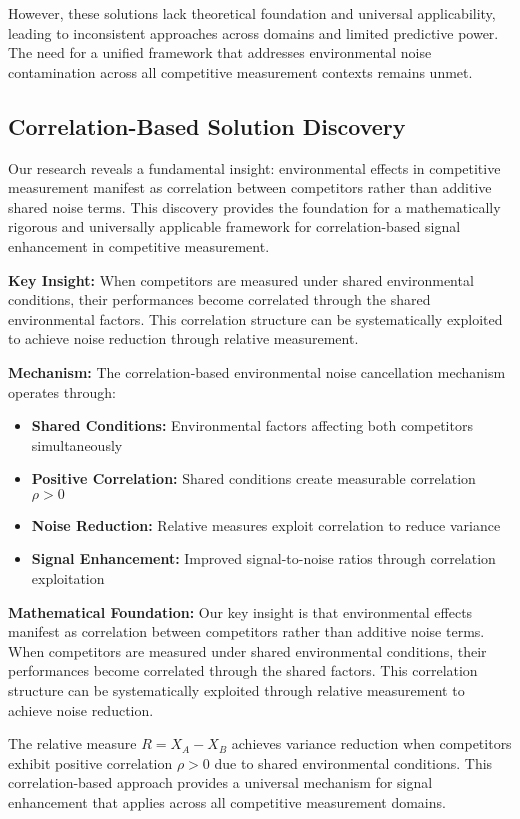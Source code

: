 However, these solutions lack theoretical foundation and universal applicability, leading to inconsistent approaches across domains and limited predictive power. The need for a unified framework that addresses environmental noise contamination across all competitive measurement contexts remains unmet.

\subsection{Correlation-Based Solution Discovery}

Our research reveals a fundamental insight: environmental effects in competitive measurement manifest as correlation between competitors rather than additive shared noise terms. This discovery provides the foundation for a mathematically rigorous and universally applicable framework for correlation-based signal enhancement in competitive measurement.

\textbf{Key Insight:}
When competitors are measured under shared environmental conditions, their performances become correlated through the shared environmental factors. This correlation structure can be systematically exploited to achieve noise reduction through relative measurement.

\textbf{Mechanism:}
The correlation-based environmental noise cancellation mechanism operates through:
\begin{itemize}
    \item \textbf{Shared Conditions:} Environmental factors affecting both competitors simultaneously
    \item \textbf{Positive Correlation:} Shared conditions create measurable correlation $\rho > 0$
    \item \textbf{Noise Reduction:} Relative measures exploit correlation to reduce variance
    \item \textbf{Signal Enhancement:} Improved signal-to-noise ratios through correlation exploitation
\end{itemize}

\textbf{Mathematical Foundation:}
Our key insight is that environmental effects manifest as correlation between competitors rather than additive noise terms. When competitors are measured under shared environmental conditions, their performances become correlated through the shared factors. This correlation structure can be systematically exploited through relative measurement to achieve noise reduction.

The relative measure $R = X_A - X_B$ achieves variance reduction when competitors exhibit positive correlation $\rho > 0$ due to shared environmental conditions. This correlation-based approach provides a universal mechanism for signal enhancement that applies across all competitive measurement domains.

